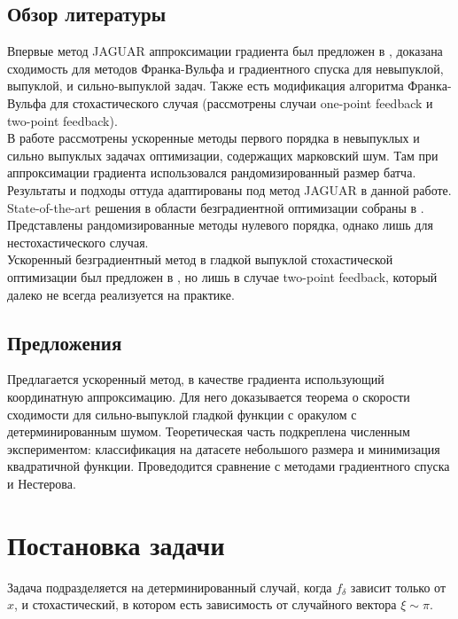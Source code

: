 \documentclass{article}
\begin{document}
\subsection{Обзор литературы}
Впервые метод JAGUAR аппроксимации градиента был предложен в \cite{bogdanov2024aspects}, доказана сходимость для методов Франка-Вульфа и градиентного спуска для невыпуклой, выпуклой, и сильно-выпуклой задач. Также есть модификация алгоритма Франка-Вульфа для стохастического случая (рассмотрены случаи one-point feedback и two-point feedback).\\
В работе \cite{beznosikov2023order} рассмотрены ускоренные методы первого порядка в невыпуклых и сильно выпуклых задачах оптимизации, содержащих марковский шум. Там при аппроксимации градиента использовался рандомизированный размер батча. Результаты и подходы оттуда адаптированы под метод JAGUAR в данной работе.\\
State-of-the-art решения в области безградиентной оптимизации собраны в \cite{gasnikov2024randomized}. Представлены рандомизированные методы нулевого порядка, однако лишь для нестохастического случая.\\
Ускоренный безградиентный метод в гладкой выпуклой стохастической оптимизации был предложен в \cite{gorbunov2020accelerated}, но лишь в случае two-point feedback, который далеко не всегда реализуется на практике.
\subsection{Предложения}
Предлагается ускоренный метод, в качестве градиента использующий координатную аппроксимацию. Для него доказывается теорема о скорости сходимости для сильно-выпуклой гладкой функции с оракулом с детерминированным шумом. Теоретическая часть подкреплена численным экспериментом: классификация на датасете небольшого размера и минимизация квадратичной функции. Проведодится сравнение с методами градиентного спуска и Нестерова.


\section{Постановка задачи}
Задача подразделяется на детерминированный случай, когда $f_\delta$ зависит только от $x$, и стохастический, в котором есть зависимость от случайного вектора $\xi \sim \pi$.
\end{document}
